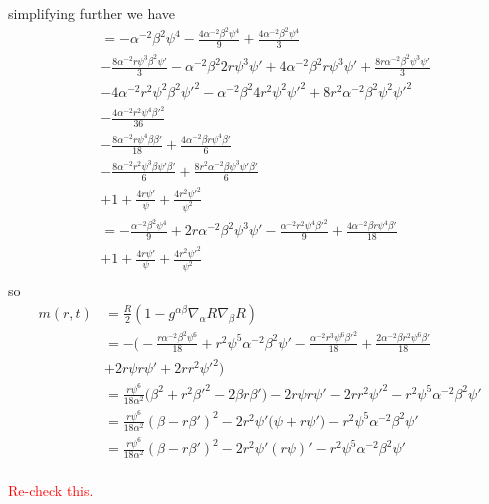 \documentclass[12pt]{article}
\numberwithin{equation}{section}
\newcommand{\redtext}[1]{\textcolor{red}{#1}}
\begin{document}
simplifying further we have
\begin{equation}
\begin{aligned}
&=-\alpha^{-2} \beta^2 \psi^4 - \frac{4 \alpha^{-2} \beta^2 \psi^4}{9} + \frac{4 \alpha^{-2} \beta^2 \psi^4}{3} \\
&- \frac{8 \alpha^{-2} r \psi^3 \beta^2  \psi'}{3} - \alpha^{-2} \beta^2 2 r \psi^3 \psi' + 4 \alpha^{-2} \beta^2 r \psi^3 \psi' + \frac{8 r \alpha^{-2} \beta^2 \psi^3 \psi'}{3}\\
&- 4 \alpha^{-2} r^2 \psi^2 \beta^2 \psi'^2  - \alpha^{-2} \beta^2 4 r^2 \psi^2 \psi'^2 + 8 r^2 \alpha^{-2} \beta^2 \psi^2 \psi'^2 \\
&- \frac{4 \alpha^{-2} r^2 \psi^4 \beta'^2}{36} \\
&- \frac{8 \alpha^{-2} r \psi^4 \beta \beta'}{18} + \frac{4 \alpha^{-2} \beta r \psi^4 \beta'}{6} \\
&- \frac{8 \alpha^{-2} r^2 \psi^3 \beta \psi' \beta'}{6} + \frac{8 r^2 \alpha^{-2} \beta \psi^3 \psi' \beta'}{6} \\
&+ 1 + \frac{4 r \psi'}{\psi} + \frac{4 r^2 \psi'^2}{\psi^2} \\
&=-\frac{\alpha^{-2} \beta^2 \psi^4}{9} + 2 r \alpha^{-2} \beta^2 \psi^3 \psi' - \frac{\alpha^{-2} r^2 \psi^4 \beta'^2}{9} + \frac{4 \alpha^{-2} \beta r \psi^4 \beta'}{18} \\
&+ 1 + \frac{4 r \psi'}{\psi} + \frac{4 r^2 \psi'^2}{\psi^2} \\
\end{aligned}
\end{equation}
so
\begin{equation}
\begin{aligned}
m(r, t) &= \frac{R}{2} (1 - g^{\alpha \beta} \nabla_\alpha R \nabla_\beta R) \\
&= - \Big( -\frac{r \alpha^{-2} \beta^2 \psi^6}{18} + r^2 \psi^5 \alpha^{-2} \beta^2 \psi' - \frac{\alpha^{-2} r^3 \psi^6 \beta'^2}{18} + \frac{2 \alpha^{-2} \beta r^2 \psi^6 \beta'}{18} \\
&+ 2 r \psi r \psi' + 2 r r^2 \psi'^2  \Big) \\
&= \frac{r \psi^6}{18 \alpha^2} \Big( \beta^2 + r^2 \beta'^2 - 2 \beta r \beta' \Big) - 2 r \psi r \psi' - 2 r r^2 \psi'^2 - r^2 \psi^5 \alpha^{-2} \beta^2 \psi' \\
&= \frac{r \psi^6}{18 \alpha^2} (\beta - r \beta')^2 - 2 r^2 \psi' \Big( \psi + r \psi' \Big) - r^2 \psi^5 \alpha^{-2} \beta^2 \psi' \\
&= \frac{r \psi^6}{18 \alpha^2} (\beta - r \beta')^2 - 2 r^2 \psi' (r \psi)' - r^2 \psi^5 \alpha^{-2} \beta^2 \psi' \\
\end{aligned}
\end{equation}

\redtext{Re-check this.}
\end{document}
